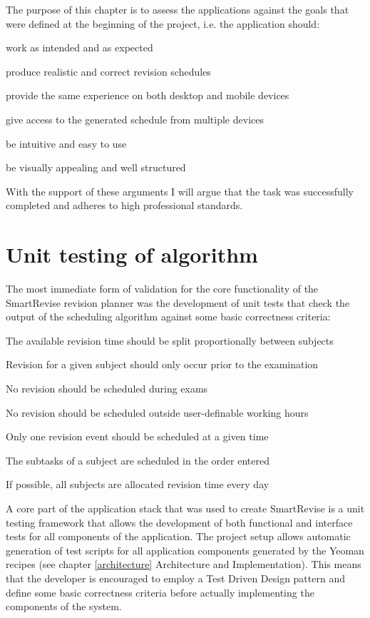 \documentclass[bsc,frontabs,twoside,singlespacing,parskip]{infthesis}     %
\begin{document}
	The purpose of this chapter is to assess the applications against the goals that were defined at the beginning of the project, i.e. the application should:
	\begin{compactitem}
		\item work as intended and as expected
		\item produce realistic and correct revision schedules
		\item provide the same experience on both desktop and mobile devices
		\item give access to the generated schedule from multiple devices
		\item be intuitive and easy to use
		\item be visually appealing and well structured
	\end{compactitem}

	With the support of these arguments I will argue that the task was successfully completed and adheres to high professional standards.

	\section{Unit testing of algorithm}\label{algo_eval}

		The most immediate form of validation for the core functionality of the SmartRevise revision planner was the development of unit tests that check the output of the scheduling algorithm against some basic correctness criteria:

		\begin{compactitem}
		  \item The available revision time should be split proportionally between subjects
		  \item Revision for a given subject should only occur prior to the examination
		  \item No revision should be scheduled during exams
		  \item No revision should be scheduled outside user-definable working hours
		  \item Only one revision event should be scheduled at a given time
		  \item The subtasks of a subject are scheduled in the order entered
		  \item If possible, all subjects are allocated revision time every day
		\end{compactitem}

		A core part of the application stack that was used to create SmartRevise is a unit testing framework that allows the development of both functional and interface tests for all components of the application. The project setup allows automatic generation of test scripts for all application components generated by the Yeoman recipes (see chapter \ref{architecture} Architecture and Implementation). This means that the developer is encouraged to employ a Test Driven Design pattern and define some basic correctness criteria before actually implementing the components of the system.
\end{document}
